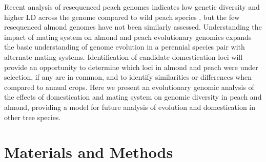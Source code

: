 \documentclass[12pt]{article}
\begin{document}
%
Recent analysis of resequenced peach genomes indicates low genetic diversity and higher LD across the genome compared to wild peach species \citep{verde2013high}, but the few resequenced almond genomes have not been similarly assessed. 
%
%
%
Understanding the impact of mating system on almond and peach evolutionary genomics expands the basic understanding of genome evolution in a perennial species pair with alternate mating systems. 
%
Identification of candidate domestication loci will provide an opportunity to determine which loci in almond and peach were under selection, if any are in common, and to identify similarities or differences when compared to annual crops. 
Here we present an evolutionary genomic analysis of the effects of domestication and mating system on genomic diversity in peach and almond, providing a model for  future analysis of evolution and domestication in other tree species.
%
\\
\section*{Materials and Methods}
%
\end{document}
